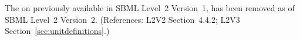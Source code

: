 The   on \Unit previously available in SBML
Level~2 Version~1, has been removed as of SBML Level~2 Version~2.
(References: L2V2 Section~4.4.2; L2V3 Section~\ref{sec:unitdefinitions}.)
